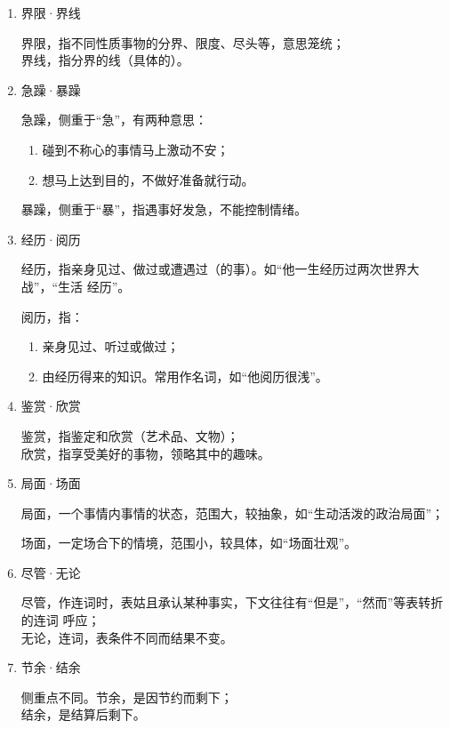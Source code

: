 \documentclass[final,oneside]{ctexbook}
\begin{document}
\begin{enumerate}
    辣手，指手段厉害或毒辣；\\
    棘手，指形容事情难办。

  \item 界限·界线

    界限，指不同性质事物的分界、限度、尽头等，意思笼统；\\
    界线，指分界的线（具体的）。

  \item 急躁·暴躁

    急躁，侧重于“急”，有两种意思：

    \begin{enumerate}
      \item 碰到不称心的事情马上激动不安；
      \item 想马上达到目的，不做好准备就行动。
    \end{enumerate}

    暴躁，侧重于“暴”，指遇事好发急，不能控制情绪。

  \item 经历·阅历

    经历，指亲身见过、做过或遭遇过（的事）。如“他一生经历过两次世界大战”，“生活
    经历”。

    阅历，指：
    \begin{enumerate}
      \item 亲身见过、听过或做过；
      \item 由经历得来的知识。常用作名词，如“他阅历很浅”。
    \end{enumerate}

  \item 鉴赏·欣赏

    鉴赏，指鉴定和欣赏（艺术品、文物）；\\
    欣赏，指享受美好的事物，领略其中的趣味。

  \item 局面·场面

    局面，一个事情内事情的状态，范围大，较抽象，如“生动活泼的政治局面”；

    场面，一定场合下的情境，范围小，较具体，如“场面壮观”。

  \item 尽管·无论

    尽管，作连词时，表姑且承认某种事实，下文往往有“但是”，“然而”等表转折的连词
    呼应；\\
    无论，连词，表条件不同而结果不变。

  \item 节余·结余

    侧重点不同。节余，是因节约而剩下；\\
    结余，是结算后剩下。


\end{enumerate}
\end{document}

